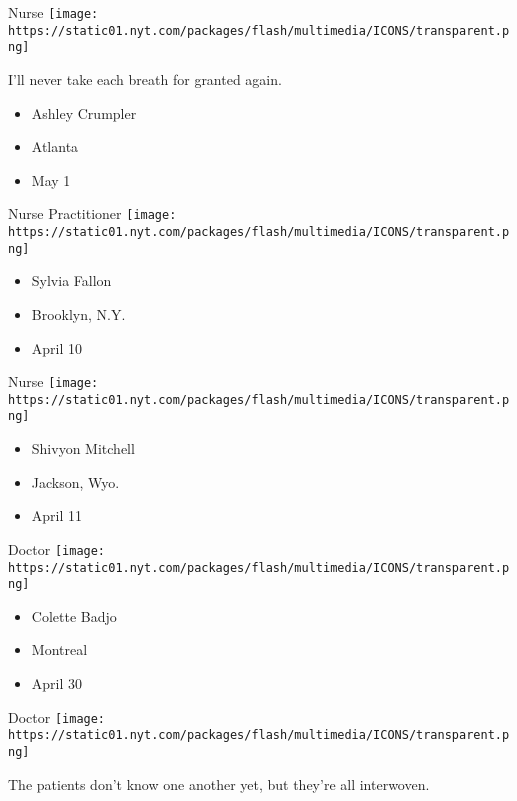 \protect\hyperlink{item-ashley-crumpler}{}

Nurse
\texttt{[image: https://static01.nyt.com/packages/flash/multimedia/ICONS/transparent.png]}

I'll never take each breath for granted again.

\begin{itemize}
\tightlist
\item
  Ashley Crumpler
\item
  Atlanta
\item
  May 1
\end{itemize}

\protect\hyperlink{item-sylvia-fallon}{}

Nurse Practitioner
\texttt{[image: https://static01.nyt.com/packages/flash/multimedia/ICONS/transparent.png]}

\begin{itemize}
\tightlist
\item
  Sylvia Fallon
\item
  Brooklyn, N.Y.
\item
  April 10
\end{itemize}

\protect\hyperlink{item-shivyon-mitchell}{}

Nurse
\texttt{[image: https://static01.nyt.com/packages/flash/multimedia/ICONS/transparent.png]}

\begin{itemize}
\tightlist
\item
  Shivyon Mitchell
\item
  Jackson, Wyo.
\item
  April 11
\end{itemize}

\protect\hyperlink{item-colette-badjo}{}

Doctor
\texttt{[image: https://static01.nyt.com/packages/flash/multimedia/ICONS/transparent.png]}

\begin{itemize}
\tightlist
\item
  Colette Badjo
\item
  Montreal
\item
  April 30
\end{itemize}

\protect\hyperlink{item-ari-ciment}{}

Doctor
\texttt{[image: https://static01.nyt.com/packages/flash/multimedia/ICONS/transparent.png]}

The patients don't know one another yet, but they're all interwoven.

